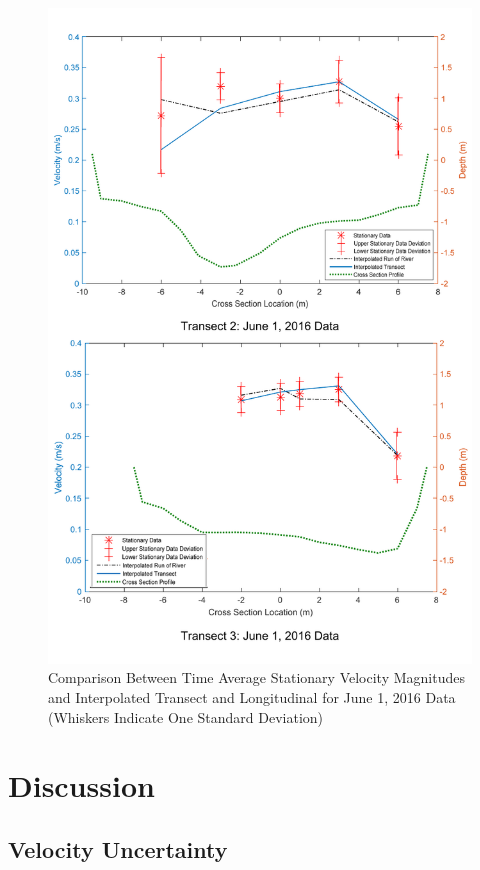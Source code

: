 \documentclass[Journal,letterpaper,BackFigs]{ascelike-new}
\begin{document}
\begin{figure}
\centering
\includegraphics[width=5.2in]{ErrorVelocity.pdf}
\caption{Comparison Between Time Average Stationary Velocity Magnitudes and Interpolated Transect and Longitudinal for June 1, 2016 Data (Whiskers Indicate One Standard Deviation)}
\label{fig:ErrorVelocity}
\end{figure}

\section{Discussion}
\subsection{Velocity Uncertainty}
\end{document}
